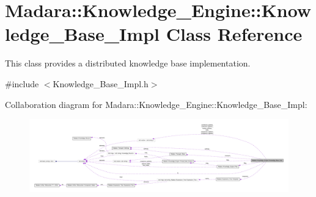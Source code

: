 \hypertarget{classMadara_1_1Knowledge__Engine_1_1Knowledge__Base__Impl}{
\section{Madara::Knowledge\_\-Engine::Knowledge\_\-Base\_\-Impl Class Reference}
\label{d3/d3c/classMadara_1_1Knowledge__Engine_1_1Knowledge__Base__Impl}
}


This class provides a distributed knowledge base implementation.  




{\ttfamily \#include $<$Knowledge\_\-Base\_\-Impl.h$>$}



Collaboration diagram for Madara::Knowledge\_\-Engine::Knowledge\_\-Base\_\-Impl:
\nopagebreak
\begin{figure}[H]
\begin{center}
\leavevmode
\includegraphics[width=400pt]{d9/dfc/classMadara_1_1Knowledge__Engine_1_1Knowledge__Base__Impl__coll__graph}
\end{center}
\end{figure}
